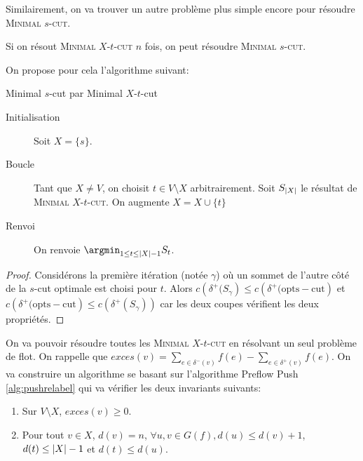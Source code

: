 \documentclass[math, info]{cours}
\begin{document}
Similairement, on va trouver un autre problème plus simple encore pour résoudre \textsc{Minimal $s$-cut}.

\begin{proposition}
	Si on résout \textsc{Minimal $X$-$t$-cut} $n$ fois, on peut résoudre \textsc{Minimal $s$-cut}.
	\label{prop:minxtcut}
\end{proposition}

On propose pour cela l'algorithme suivant:
\begin{algorithm}
	\caption{Minimal $s$-cut par Minimal $X$-$t$-cut}
	\begin{description}
		\item[Initialisation] Soit $X = \{s\}$.
		\item[Boucle] Tant que $X \neq V$, on choisit $t \in V\setminus X$ arbitrairement.
		      Soit $S_{\left|X\right|}$ le résultat de \textsc{Minimal $X$-$t$-cut}.
		      On augmente $X = X \cup \{t\}$
		\item[Renvoi] On renvoie $\displaystyle\argmin_{1 \leq t \leq \abs{X} - 1} S_{t}$.
	\end{description}
\end{algorithm}

\begin{proof}
	Considérons la première itération (notée $\gamma$) où un sommet de l'autre côté de la $s$-cut optimale est choisi pour $t$.
	Alors $c\left(\delta^{+}(S_{\gamma}\right) \leq c\left(\delta^{+}(\mathrm{opt s-cut}\right)$ et $c\left(\delta^{+}(\mathrm{opt s-cut}\right) \leq c(\delta^{+}(S_{\gamma}))$ car les deux coupes vérifient les deux propriétés.
\end{proof}

On va pouvoir résoudre toutes les \textsc{Minimal $X$-$t$-cut} en résolvant un seul problème de flot.
On rappelle que $exces(v) = \sum_{e \in \delta^{-}(v)} f(e) - \sum_{e \in \delta^{+}(v)} f(e)$.
On va construire un algorithme se basant sur l'algorithme Preflow Push \ref{alg:pushrelabel} qui va vérifier les deux invariants suivants:
\begin{enumerate}
	\item Sur $V \setminus X$, $exces(v) \geq 0$.
	\item Pour tout $v \in X$, $d(v) = n$, $\forall u, v \in G(f), d(u) \leq d(v) + 1$, $d(t) \leq \left|X\right| - 1$ et $d(t) \leq d(u)$.
\end{enumerate}
\end{document}
